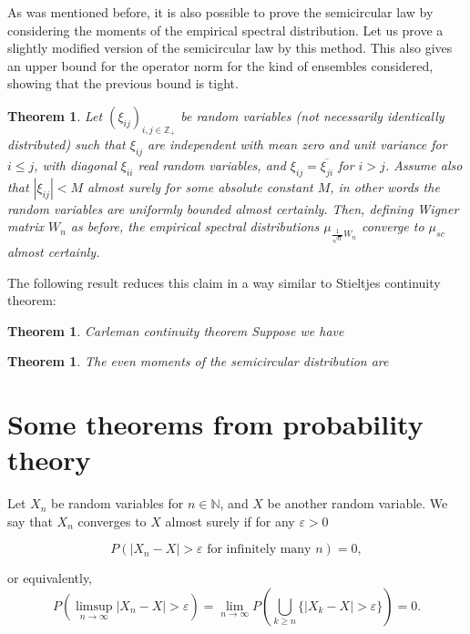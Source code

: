 \documentclass[12pt,a4paper,leqno]{report}
\newcommand{\N}{\mathbb{N}}
\newcommand{\Z}{\mathbb{Z}}
\newcommand{\eps}{\varepsilon}
\theoremstyle{plain}
\newtheorem{theo}[equation]{Theorem}
\theoremstyle{definition}
\theoremstyle{remark}
\begin{document}
As was mentioned before, it is also possible to prove the semicircular law by considering the moments of the empirical spectral distribution. Let us prove a slightly modified version of the semicircular law by this method. This also gives an upper bound for the operator norm for the kind of ensembles considered, showing that the previous bound is tight.

\begin{theo}
Let $(\xi_{ij})_{i,j \in \Z_+}$ be random variables (not necessarily identically distributed) such that $\xi_{ij}$
are independent with mean zero and unit variance for $i \leq j$, with diagonal $\xi_{ii}$ real random variables, and $\xi_{ij}=\overline{\xi_{ji}}$ for $i>j$. Assume also that $|\xi_{ij}|<M$ almost surely for some absolute constant $M$, in other words the random variables are uniformly bounded almost certainly.
Then, defining Wigner matrix $W_n$ as before, the empirical spectral distributions $\mu_{\frac{1}{\sqrt{n}}W_n}$ converge to $\mu_{sc}$ almost certainly.
\end{theo}

The following result reduces this claim in a way similar to Stieltjes continuity theorem:

\begin{theo}
\emph{Carleman continuity theorem} Suppose we have
\end{theo}

\begin{theo}
The even moments of the semicircular distribution are

\end{theo}



\appendix

\chapter{Some theorems from probability theory}

Let $X_n$ be random variables for $n \in \N$, and $X$ be another random variable. We say that $X_n$ converges to $X$ almost surely if for any $\eps > 0$

\begin{equation*}
P(|X_n-X|>\eps \textrm{ for infinitely many $n$}) = 0,
\end{equation*}

or equivalently,
\begin{equation*}
P(\limsup_{n \to \infty} |X_n-X|>\eps) =
\lim_{n\to \infty} P(\bigcup_{k\geq n} \{|X_k-X|>\eps\}) = 0.
\end{equation*}
\end{document}
